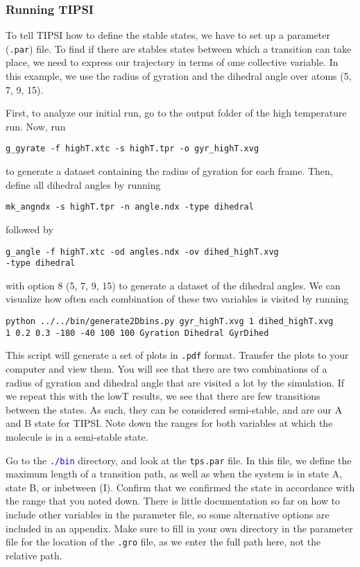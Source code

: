 \documentclass[]{article}
\begin{document}
\subsubsection*{Running TIPSI}

To tell \textsc{TIPSI} how to define the stable states, we have to set up a parameter (\texttt{.par}) file. To find if there are stables states between which a transition can take place, we need to express our trajectory in terms of ome collective variable. In this example, we use the radius of gyration and the dihedral angle over atoms (5, 7, 9, 15).

First, to analyze our initial run, go to the output folder of the high temperature run. Now, run
%
\begin{lstlisting}
g_gyrate -f highT.xtc -s highT.tpr -o gyr_highT.xvg
\end{lstlisting}
%
to generate a dataset containing the radius of gyration for each frame. Then, define all dihedral angles by running
%
\begin{lstlisting}
mk_angndx -s highT.tpr -n angle.ndx -type dihedral
\end{lstlisting}
%
followed by
%
\begin{lstlisting}
g_angle -f highT.xtc -od angles.ndx -ov dihed_highT.xvg 
-type dihedral
\end{lstlisting}
%
with option 8 (5, 7, 9, 15) to generate a dataset of the dihedral angles. We can visualize how often each combination of these two variables is visited by running
%
\begin{lstlisting}
python ../../bin/generate2Dbins.py gyr_highT.xvg 1 dihed_highT.xvg 
1 0.2 0.3 -180 -40 100 100 Gyration Dihedral GyrDihed
\end{lstlisting}
%
This script will generate a set of plots in \texttt{.pdf} format. Transfer the plots to your computer and view them. You will see that there are two combinations of a radius of gyration and dihedral angle that are visited a lot by the simulation. If we repeat this with the lowT results, we see that there are few transitions between the states. As such, they can be considered semi-stable, and are our A and B state for \textsc{TIPSI}. Note down the ranges for both variables at which the molecule is in a semi-stable state.

Go to the \textcolor{blue}{\texttt{./bin}} directory, and look at the \texttt{tps.par} file. In this file, we define the maximum length of a transition path, as well as when the system is in state A, state B, or inbetween (I). Confirm that we confirmed the state in accordance with the range that you noted down. There is little documentation so far on how to include other variables in the parameter file, so some alternative options are included in an appendix. Make sure to fill in your own directory in the parameter file for the location of the \texttt{.gro} file, as we enter the full path here, not the relative path.
\end{document}

